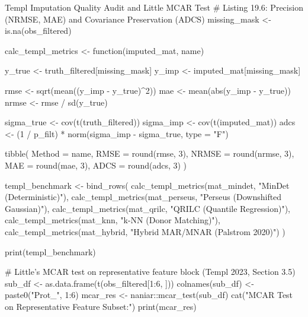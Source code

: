 \documentclass[11pt,oneside]{book}
\begin{document}
\begin{rchunk}{Templ Imputation Quality Audit and Little MCAR Test}
# Listing 19.6: Precision (NRMSE, MAE) and Covariance Preservation (ADCS)
missing_mask <- is.na(obs_filtered)

calc_templ_metrics <- function(imputed_mat, name) {
  y_true <- truth_filtered[missing_mask]
  y_imp  <- imputed_mat[missing_mask]
  
  rmse <- sqrt(mean((y_imp - y_true)^2))
  mae  <- mean(abs(y_imp - y_true))
  nrmse <- rmse / sd(y_true)
  
  sigma_true <- cov(t(truth_filtered))
  sigma_imp  <- cov(t(imputed_mat))
  adcs <- (1 / p_filt) * norm(sigma_imp - sigma_true, type = "F")
  
  tibble(
    Method = name,
    RMSE   = round(rmse, 3),
    NRMSE  = round(nrmse, 3),
    MAE    = round(mae, 3),
    ADCS   = round(adcs, 3)
  )
}

templ_benchmark <- bind_rows(
  calc_templ_metrics(mat_mindet, "MinDet (Deterministic)"),
  calc_templ_metrics(mat_perseus, "Perseus (Downshifted Gaussian)"),
  calc_templ_metrics(mat_qrilc, "QRILC (Quantile Regression)"),
  calc_templ_metrics(mat_knn, "k-NN (Donor Matching)"),
  calc_templ_metrics(mat_hybrid, "Hybrid MAR/MNAR (Palstrom 2020)")
)

print(templ_benchmark)

# Little's MCAR test on representative feature block (Templ 2023, Section 3.5)
sub_df <- as.data.frame(t(obs_filtered[1:6, ]))
colnames(sub_df) <- paste0("Prot_", 1:6)
mcar_res <- naniar::mcar_test(sub_df)
cat("\nLittle MCAR Test on Representative Feature Subset:\n")
print(mcar_res)
\end{rchunk}
\end{document}
